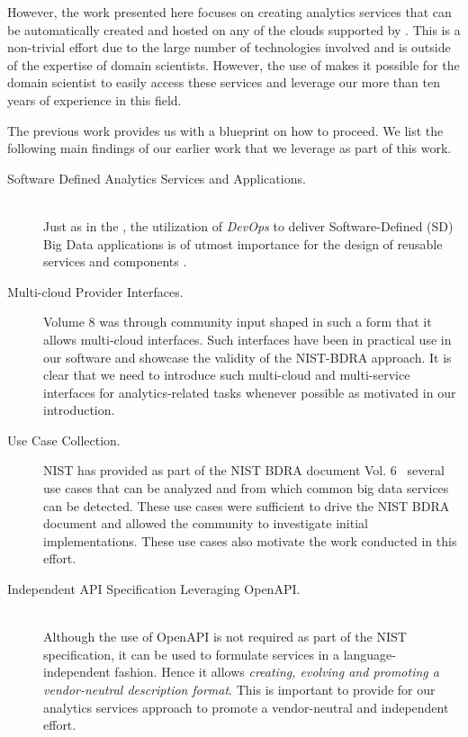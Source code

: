 However, the work presented here focuses on creating analytics services that can be automatically created and hosted on any of the clouds supported by \Cloudmesh. This is a non-trivial effort due to the large number of technologies involved and is outside of the expertise of domain scientists. However, the use of \Cloudmesh makes it possible for the domain scientist to easily access these services and leverage our more than ten years of experience in this field.

The previous work provides us with a blueprint on how to proceed.  We list the following main findings of our earlier work that we leverage as part of this work.

\begin{description}
  
\item[Software Defined Analytics Services and Applications.] ~\\ 
  Just as
  in the , the utilization of \emph{DevOps} to deliver
  Software-Defined (SD) Big Data applications is of
 utmost importance for the design of reusable services and components . 
  
\item[Multi-cloud Provider Interfaces.] Volume 8 was through community
  input shaped in such a form that it allows multi-cloud
  interfaces. Such interfaces have been in practical use in our software and showcase the validity of the NIST-BDRA approach. It is clear that we need to introduce such multi-cloud and multi-service
  interfaces for analytics-related tasks whenever possible as motivated in our introduction. 

\item[Use Case Collection.] NIST has provided as part of the NIST BDRA
  document Vol. 6~\cite{nist-v6} several use cases that can be analyzed and from which common big data services can be detected. These use
  cases were sufficient to drive the NIST BDRA document \cite{nist-v6}
  and allowed the community to investigate initial implementations. These use cases also motivate the work conducted in this effort.

\item[Independent API Specification Leveraging OpenAPI.] ~\\ Although the use of OpenAPI \cite{openapi,openapi-tools} is not required as part of the NIST specification, it can be used to formulate services in a
  language-independent fashion. Hence it allows {\em creating, evolving and promoting a vendor-neutral description format}. This is important to provide for our analytics services approach to promote a vendor-neutral and independent effort.


\end{description}
